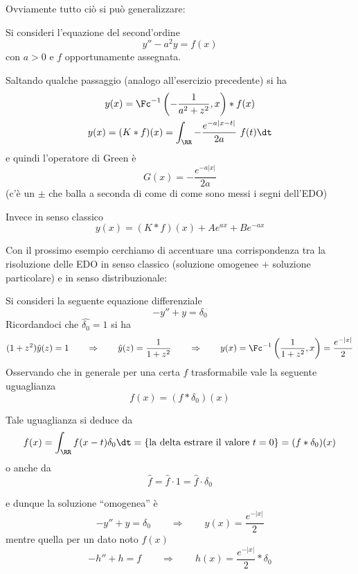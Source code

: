 Ovviamente tutto ciò si può generalizzare:
\begin{exa}
Si consideri l'equazione del second'ordine
\begin{equation*}
y''-a^2y=f(x)
\end{equation*}
con $a>0$ e $f$ opportunamente assegnata.

Saltando qualche passaggio (analogo all'esercizio precedente) si ha
\begin{gather*}
y(x)=\Fc^{-1}\left(-\frac{1}{a^2+z^2},x\right)*f(x) \\
y(x)=(K*f)(x)=\int_\RR -\frac{e^{-a|x-t|}}{2a}\ f(t)\dt
\end{gather*}
e quindi l'operatore di Green è
\begin{equation*}
G(x)=-\frac{e^{-a|x|}}{2a}
\end{equation*}
(c'è un $\pm$ che balla a seconda di come di come sono messi i segni dell'EDO)

Invece in senso classico
\begin{equation*}
y(x)=(K*f)(x)+Ae^{ax}+Be^{-ax}
\end{equation*}
\end{exa}

Con il prossimo esempio cerchiamo di accentuare una corrispondenza tra la risoluzione delle EDO in senso classico (soluzione omogenee + soluzione particolare) e in senso distribuzionale:
\begin{exa}
Si consideri la seguente equazione differenziale
\begin{equation*}
-y''+y=\delta_0
\end{equation*}
Ricordandoci che $\hat{\delta_0}=1$ si ha
\begin{equation*}
(1+z^2)\hat{y}(z)=1\qquad\Rightarrow\qquad \hat{y}(z)=\frac{1}{1+z^2}\qquad\Rightarrow\qquad  y(x)=\Fc^{-1}\left(\frac{1}{1+z^2},x\right)=\frac{e^{-|x|}}{2}
\end{equation*}
Osservando che in generale per una certa $f$ trasformabile vale la seguente uguaglianza
\begin{equation*}
f(x)=(f*\delta_0)(x)
\end{equation*}
\begin{rem}
Tale uguaglianza si deduce da
\begin{equation*}
f(x)=\int_\RR f(x-t)\delta_0\dt=\{\text{la delta estrare il valore }t=0\}=(f*\delta_0)(x)
\end{equation*}
o anche da
\begin{equation*}
\hat{f}=\hat{f}\cdot 1=\hat{f}\cdot\delta_0
\end{equation*}
\end{rem}
e dunque la soluzione ``omogenea'' è
\begin{equation*}
-y''+y=\delta_0\qquad\Rightarrow\qquad y(x)=\frac{e^{-|x|}}{2}
\end{equation*}
mentre quella per un dato noto $f(x)$
\begin{equation*}
-h''+h=f\qquad\Rightarrow\qquad h(x)=\frac{e^{-|x|}}{2}*\delta_0
\end{equation*}
\end{exa}

